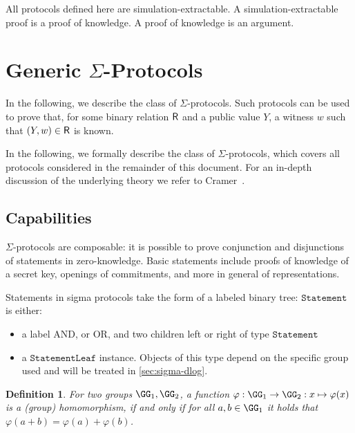 \documentclass[runningheads,11pt]{article}
\newtheorem{definition}{Definition}
\newcommand{\statementnode}{\texttt{Statement}}
\newcommand{\statementleaf}{\texttt{StatementLeaf}}
\begin{document}
All protocols defined here are simulation-extractable. A simulation-extractable proof is a proof of knowledge. A proof of knowledge is an argument.


\section{Generic $\Sigma$-Protocols}
In the following, we describe the class of $\Sigma$-protocols.
Such protocols can be used to prove that, for some binary relation $\mathsf{R}$ and a public value $Y$, a witness $w$ such that $(Y,w)\in\mathsf{R}$ is known.

In the following, we formally describe the class of $\Sigma$-protocols, which covers all protocols considered in the remainder of this document.
 For an in-depth discussion of the underlying theory we refer to Cramer~\cite{cramer97}.

 \subsection{Capabilities}
 $\Sigma$-protocols are composable: it is possible to prove conjunction and disjunctions of statements in zero-knowledge. Basic statements include proofs of knowledge of a secret key, openings of commitments, and more in general of representations.

Statements in sigma protocols take the form of a labeled binary tree:
$\statementnode$ is either:
\begin{itemize}
  \item a label \textsf{AND}, or \textsf{OR}, and two children \textsf{left} or \textsf{right} of type $\statementnode$
  \item a $\statementleaf$ instance. Objects of this type depend on the specific group used and will be treated in \cref{sec:sigma-dlog}.
\end{itemize}

 \begin{definition}
  For two groups $\GG_1,\GG_2$, a function $\varphi:\GG_1\to\GG_2:x\mapsto\varphi(x)$ is a \emph{(group) homomorphism}, if and only if for all $a,b\in\GG_1$ it holds that $\varphi(a+b)=\varphi(a)+\varphi(b)$.
\end{definition}
\end{document}
